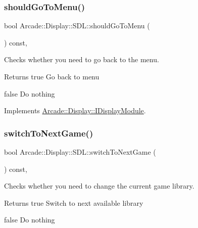 \mbox{\label{classArcade_1_1Display_1_1SDL_a044e009d7fc03813fce09abed3a6694c}} 
\subsubsection{\texorpdfstring{shouldGoToMenu()}{shouldGoToMenu()}}
{\footnotesize\ttfamily bool Arcade\+::\+Display\+::\+S\+D\+L\+::should\+Go\+To\+Menu (\begin{DoxyParamCaption}{ }\end{DoxyParamCaption}) const\hspace{0.3cm}{\ttfamily [final]}, {\ttfamily [virtual]}}



Checks whether you need to go back to the menu. 

\begin{DoxyReturn}{Returns}
true Go back to menu 

false Do nothing 
\end{DoxyReturn}


Implements \mbox{\hyperlink{classArcade_1_1Display_1_1IDisplayModule_ad060f6b99f2adffaf02a4226fc40d0ab}{Arcade\+::\+Display\+::\+I\+Display\+Module}}.

\mbox{\label{classArcade_1_1Display_1_1SDL_a3f197b6ea176410b4eb472d7e848eb10}} 
\subsubsection{\texorpdfstring{switchToNextGame()}{switchToNextGame()}}
{\footnotesize\ttfamily bool Arcade\+::\+Display\+::\+S\+D\+L\+::switch\+To\+Next\+Game (\begin{DoxyParamCaption}{ }\end{DoxyParamCaption}) const\hspace{0.3cm}{\ttfamily [final]}, {\ttfamily [virtual]}}



Checks whether you need to change the current game library. 

\begin{DoxyReturn}{Returns}
true Switch to next available library 

false Do nothing 
\end{DoxyReturn}


